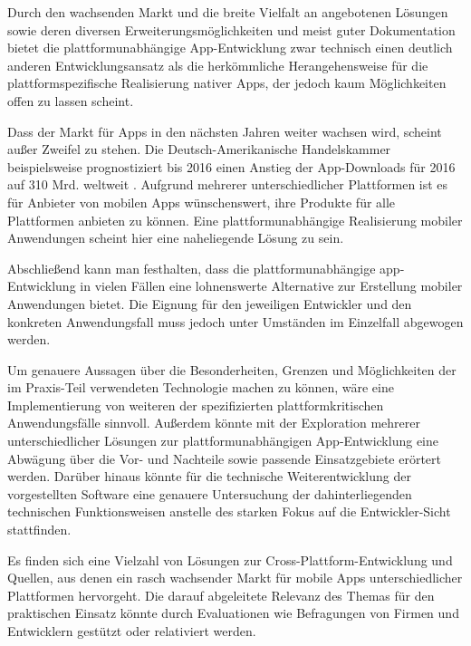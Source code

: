 
Durch den wachsenden Markt und die breite Vielfalt an angebotenen Lösungen sowie deren diversen Erweiterungsmöglichkeiten und meist guter Dokumentation bietet die plattformunabhängige App-Entwicklung zwar technisch einen deutlich anderen Entwicklungsansatz als die herkömmliche Herangehensweise für die plattformspezifische Realisierung nativer Apps, der jedoch kaum Möglichkeiten offen zu lassen scheint.

Dass der Markt für Apps in den nächsten Jahren weiter wachsen wird, scheint außer Zweifel zu stehen. Die Deutsch-Amerikanische Handelskammer beispielsweise prognostiziert bis 2016 einen Anstieg der App-Downloads für 2016 auf 310 Mrd. weltweit \cite{Mobile_Apps_Download-Zahlen}.
Aufgrund mehrerer unterschiedlicher Plattformen ist es für Anbieter von mobilen Apps wünschenswert, ihre Produkte für alle Plattformen anbieten zu können. Eine plattformunabhängige Realisierung mobiler Anwendungen scheint hier eine naheliegende Lösung zu sein. 

Abschließend kann man festhalten, dass die plattformunabhängige \gls{app}-Entwicklung in vielen Fällen eine lohnenswerte Alternative zur Erstellung mobiler Anwendungen bietet.
Die Eignung für den jeweiligen Entwickler und den konkreten Anwendungsfall muss jedoch unter Umständen im Einzelfall abgewogen werden.



Um genauere Aussagen über die Besonderheiten, Grenzen und Möglichkeiten  der im Praxis-Teil verwendeten Technologie machen zu können, wäre eine Implementierung von weiteren der spezifizierten plattformkritischen Anwendungsfälle sinnvoll.
Außerdem könnte mit der Exploration mehrerer unterschiedlicher Lösungen zur plattformunabhängigen App-Entwicklung eine Abwägung über die Vor- und Nachteile sowie passende Einsatzgebiete erörtert werden.
Darüber hinaus könnte für die technische Weiterentwicklung der vorgestellten Software eine genauere Untersuchung der dahinterliegenden technischen Funktionsweisen anstelle des starken Fokus auf die Entwickler-Sicht stattfinden.

Es finden sich eine Vielzahl von Lösungen zur Cross-Plattform-Entwicklung und Quellen, aus denen ein rasch wachsender Markt für mobile Apps unterschiedlicher Plattformen hervorgeht. Die darauf abgeleitete Relevanz des Themas für den praktischen Einsatz könnte durch Evaluationen wie Befragungen von Firmen und Entwicklern gestützt oder relativiert werden.

